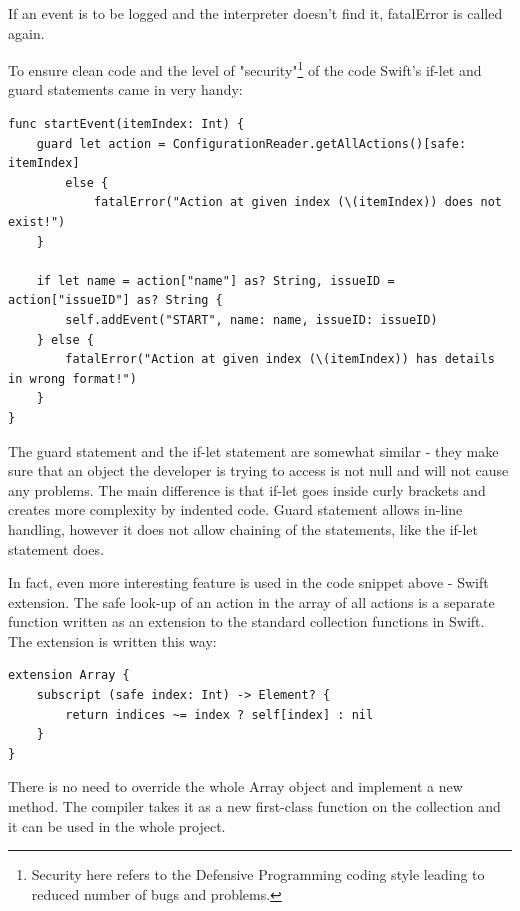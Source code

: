 If an event is to be logged and the interpreter doesn't find it, fatalError is called again.

\newpage

To ensure clean code and the level of "security"\footnote{Security here refers to the Defensive Programming coding style leading to reduced number of bugs and problems.} of the code Swift's if-let and guard statements came in very handy:

\bigbreak

\begin{lstlisting}
func startEvent(itemIndex: Int) {
	guard let action = ConfigurationReader.getAllActions()[safe: itemIndex]
		else {
			fatalError("Action at given index (\(itemIndex)) does not exist!")
	}
        
	if let name = action["name"] as? String, issueID = action["issueID"] as? String {
		self.addEvent("START", name: name, issueID: issueID)
	} else {
		fatalError("Action at given index (\(itemIndex)) has details in wrong format!")
	}
}
\end{lstlisting}	

\bigbreak

The guard statement and the if-let statement are somewhat similar - they make sure that an object the developer is trying to access is not null and will not cause any problems. The main difference is that if-let goes inside curly brackets and creates more complexity by indented code. Guard statement allows in-line handling, however it does not allow chaining of the statements, like the if-let statement does.

In fact, even more interesting feature is used in the code snippet above - Swift extension. The safe look-up of an action in the array of all actions is a separate function written as an extension to the standard collection functions in Swift. The extension is written this way:

\bigbreak

\begin{lstlisting}
extension Array {
    subscript (safe index: Int) -> Element? {
        return indices ~= index ? self[index] : nil
    }
}
\end{lstlisting}	

\bigbreak

There is no need to override the whole Array object and implement a new method. The compiler takes it as a new first-class function on the collection and it can be used in the whole project.

\newpage

